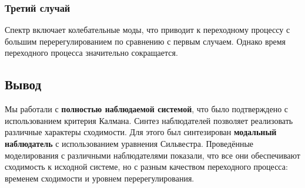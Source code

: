 \subsubsection{Третий случай}
Спектр включает колебательные моды, что приводит к переходному процессу с большим перерегулированием по сравнению с первым случаем. Однако время переходного процесса значительно сокращается.


\subsection{Вывод}
Мы работали с \textbf{полностью наблюдаемой системой}, что было подтверждено с использованием критерия Калмана. Синтез наблюдателей позволяет реализовать различные характеры сходимости. Для этого был синтезирован \textbf{модальный наблюдатель} с использованием уравнения Сильвестра. Проведённые моделирования с различными наблюдателями показали, что все они обеспечивают сходимость к исходной системе, но с разным качеством переходного процесса: временем сходимости и уровнем перерегулирования.